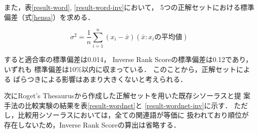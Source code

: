 \documentclass[japanese]{jnlp_1.3a}
\begin{document}
また，表\ref{result-word}, \ref{result-word-inv}において，
5つの正解セットにおける標準偏差（式\ref{hensa}）を求める．

\begin{equation}
\label{hensa}
\sigma^2=\frac{1}{n} \sum_{i=1}^{n}\left(x_i - \bar{x}\right) 
\left(\bar{x} :x_iの平均値\right)
\end{equation}

すると適合率の標準偏差は0.014，
Inverse Rank Scoreの標準偏差は0.12であり，いずれも
標準偏差は10\%以内に収まっている．
このことから，正解セットによる
ばらつきによる影響はあまり大きくないと考えられる．


次にRoget's Thesaurusから作成した正解セットを用いた既存シソーラスと提
案手法の比較実験の結果を表\ref{result-wordnet}と
    \ref{result-wordnet-inv}に示す．
ただし，比較用シソーラスにおいては，全ての関連語が等価に
扱われており順位が存在しないため，Inverse Rank Scoreの算出は省略する．
\end{document}
